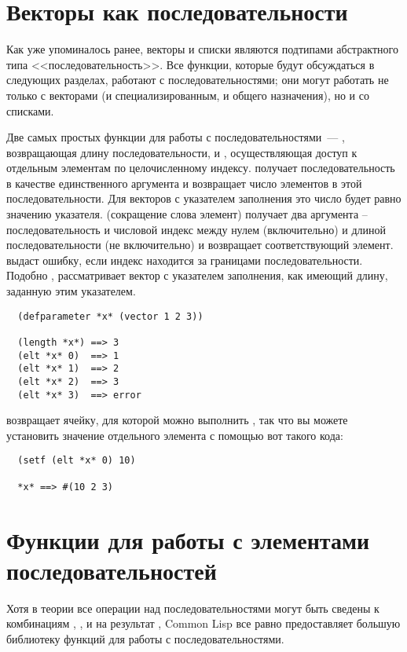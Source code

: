 \section{Векторы как последовательности}

Как уже упоминалось ранее, векторы и списки являются подтипами абстрактного типа
<<последовательность>>.  Все функции, которые будут обсуждаться в следующих разделах,
работают с последовательностями; они могут работать не только с векторами (и
специализированным, и общего назначения), но и со списками.

Две самых простых функции для работы с последовательностями~--- ,
возвращающая длину последовательности, и , осуществляющая доступ к
отдельным элементам по целочисленному индексу.   получает
последовательность в качестве единственного аргумента и возвращает число элементов в этой
последовательности.  Для векторов с указателем заполнения это число будет равно значению
указателя.  (сокращение слова элемент) получает два аргумента --
последовательность и числовой индекс между нулем (включительно) и длиной
последовательности (не включительно) и возвращает соответствующий элемент.   выдаст ошибку,
если индекс находится за границами последовательности.  Подобно , 
рассматривает вектор с указателем заполнения, как имеющий длину, заданную этим
указателем.

\begin{verbatim}
  (defparameter *x* (vector 1 2 3))
  
  (length *x*) ==> 3
  (elt *x* 0)  ==> 1
  (elt *x* 1)  ==> 2
  (elt *x* 2)  ==> 3
  (elt *x* 3)  ==> error
\end{verbatim}

 возвращает ячейку, для которой можно выполнить , так что вы можете
установить значение отдельного элемента с помощью вот такого кода:

\begin{verbatim}
  (setf (elt *x* 0) 10)
  
  *x* ==> #(10 2 3)
\end{verbatim}

\section{Функции для работы с элементами последовательностей}

Хотя в теории все операции над последовательностями могут быть сведены к комбинациям
, , и  на результат , Common Lisp все равно
предоставляет большую библиотеку функций для работы с последовательностями.

